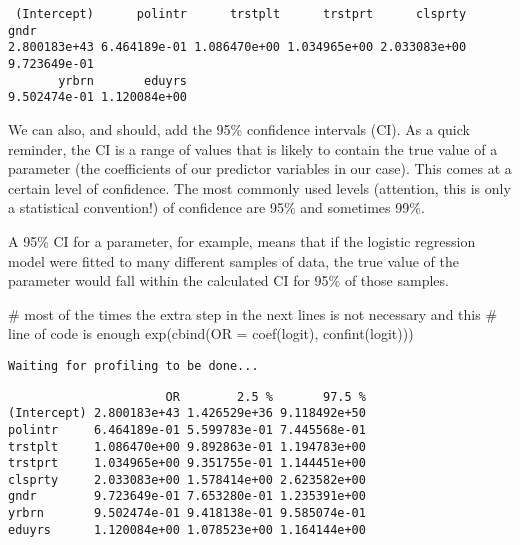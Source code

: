 \documentclass[
  letterpaper,
  DIV=11,
  numbers=noendperiod]{scrreprt}
\newenvironment{Shaded}{\begin{snugshade}}{\end{snugshade}}
\newcommand{\AttributeTok}[1]{\textcolor[rgb]{0.40,0.45,0.13}{#1}}
\newcommand{\CommentTok}[1]{\textcolor[rgb]{0.37,0.37,0.37}{#1}}
\newcommand{\FunctionTok}[1]{\textcolor[rgb]{0.28,0.35,0.67}{#1}}
\newcommand{\NormalTok}[1]{\textcolor[rgb]{0.00,0.23,0.31}{#1}}
\begin{document}
\begin{verbatim}
 (Intercept)      polintr      trstplt      trstprt      clsprty         gndr 
2.800183e+43 6.464189e-01 1.086470e+00 1.034965e+00 2.033083e+00 9.723649e-01 
       yrbrn       eduyrs 
9.502474e-01 1.120084e+00 
\end{verbatim}

We can also, and should, add the 95\% confidence intervals (CI). As a
quick reminder, the CI is a range of values that is likely to contain
the true value of a parameter (the coefficients of our predictor
variables in our case). This comes at a certain level of confidence. The
most commonly used levels (attention, this is only a statistical
convention!) of confidence are 95\% and sometimes 99\%.

A 95\% CI for a parameter, for example, means that if the logistic
regression model were fitted to many different samples of data, the true
value of the parameter would fall within the calculated CI for 95\% of
those samples.

\begin{Shaded}
\begin{Highlighting}[]
\CommentTok{\# most of the times the extra step in the next lines is not necessary and this }
\CommentTok{\# line of code is enough}
\FunctionTok{exp}\NormalTok{(}\FunctionTok{cbind}\NormalTok{(}\AttributeTok{OR =} \FunctionTok{coef}\NormalTok{(logit), }\FunctionTok{confint}\NormalTok{(logit)))}
\end{Highlighting}
\end{Shaded}

\begin{verbatim}
Waiting for profiling to be done...
\end{verbatim}

\begin{verbatim}
                      OR        2.5 %       97.5 %
(Intercept) 2.800183e+43 1.426529e+36 9.118492e+50
polintr     6.464189e-01 5.599783e-01 7.445568e-01
trstplt     1.086470e+00 9.892863e-01 1.194783e+00
trstprt     1.034965e+00 9.351755e-01 1.144451e+00
clsprty     2.033083e+00 1.578414e+00 2.623582e+00
gndr        9.723649e-01 7.653280e-01 1.235391e+00
yrbrn       9.502474e-01 9.418138e-01 9.585074e-01
eduyrs      1.120084e+00 1.078523e+00 1.164144e+00
\end{verbatim}
\end{document}
